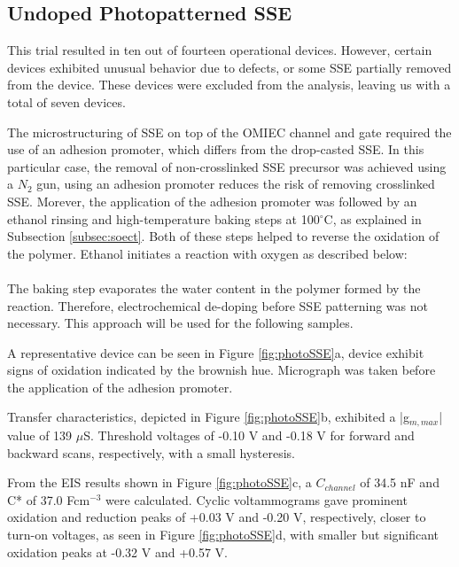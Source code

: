 \subsection{Undoped Photopatterned SSE} %
This trial resulted in ten out of fourteen operational devices. %
However, certain devices exhibited unusual behavior due to defects, or some SSE partially removed from the device. These devices were excluded from the analysis, leaving us with a total of seven devices.

The microstructuring of SSE on top of the OMIEC channel and gate required the use of an adhesion promoter, which differs from the drop-casted SSE. In this particular case, the removal of non-crosslinked SSE precursor was achieved using a $N_{2}$ gun, using an adhesion promoter reduces the risk of removing crosslinked SSE. %
Morever, the application of the adhesion promoter was followed by an ethanol rinsing and high-temperature baking steps at 100$^{\circ}$C, as explained in Subsection \ref{subsec:soect}. Both of these steps helped to reverse the oxidation of the polymer. Ethanol initiates a reaction with oxygen as described below: \\

\hspace{2.5cm}  \\ 

The baking step evaporates the water content in the polymer formed by the reaction. Therefore, electrochemical de-doping before SSE patterning was not necessary. This approach will be used for the following samples.

A representative device can be seen in Figure \ref{fig:photoSSE}a, device exhibit signs of oxidation indicated by the brownish hue. Micrograph was taken before the application of the adhesion promoter. 

Transfer characteristics, depicted in Figure \ref{fig:photoSSE}b, exhibited a |g$_{m,max}$| value of 139 $\mu$S. Threshold voltages of -0.10 V and -0.18 V for forward and backward scans, respectively, with a small hysteresis. 

From the EIS results shown in Figure \ref{fig:photoSSE}c, a $C_{channel}$ of 34.5 nF and C* of 37.0 Fcm$^{-3}$ were calculated. Cyclic voltammograms gave prominent oxidation and reduction peaks of +0.03 V and -0.20 V, respectively, closer to turn-on voltages, as seen in Figure \ref{fig:photoSSE}d, with smaller but significant oxidation peaks at -0.32 V and +0.57 V.

